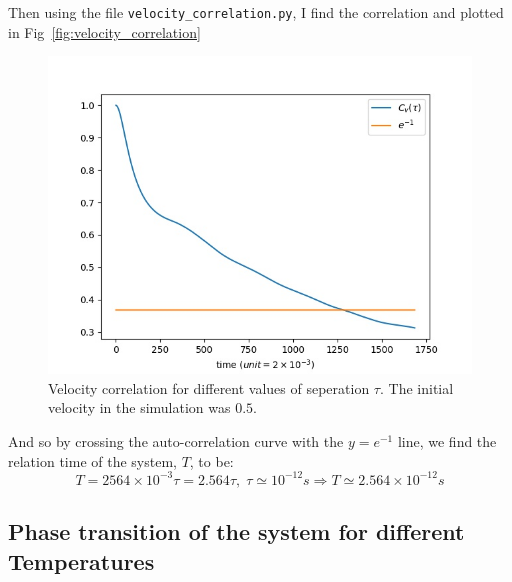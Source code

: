 \documentclass[12pt, a4paper]{article}
\begin{document}
	Then using the file \texttt{velocity\_correlation.py}, I find the correlation and plotted in 
	Fig~\ref{fig:velocity_correlation}
	
	\begin{figure}[h!]
		\centering
		\includegraphics[width=.9\linewidth]{../results/velocity_correlation.jpg}
		\caption{Velocity correlation for different values of seperation $\tau$. The initial velocity in the simulation was 
			$0.5$.}
	\end{figure}
	
	And so by crossing the auto-correlation curve with the $y = e^{-1}$ line, we find the relation time of the 
	system, $T$, to be:
	\begin{equation}
		T = 2564 \times 10^{-3} \tau = 2.564 \tau, \; \tau \simeq 10^{-12} s \Rightarrow T \simeq 2.564 \times 
		10^{-12} s
	\end{equation}
	
	\subsection{Phase transition of the system for different Temperatures}
\end{document}
